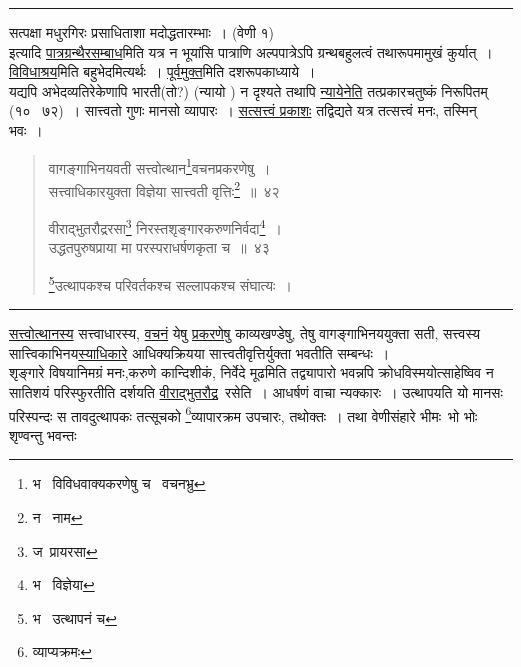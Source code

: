 \documentclass[11pt, openany]{book}
\begin{document}
\hrule

\vspace{2mm}
{\qt सत्पक्षा मधुरगिरः प्रसाधिताशा मदोद्धतारम्भाः~।} (वेणी १)\\

इत्यादि \underline{पात्रग्रन्थैरसम्बाध}मिति यत्र न भूयांसि पात्राणि अल्पपात्रेऽपि ग्रन्थबहुलत्वं तथारूपमामुखं कुर्यात्~। \underline{विविधाश्रय}मिति बहुभेदमित्यर्थः~। \underline{पूर्वमुक्त}मिति दशरूपकाध्याये~।\\

यद्यपि अभेदव्यतिरेकेणापि भारती(तो?) (न्यायो ) न दृश्यते तथापि \underline{न्यायेनेति} तत्प्रकारचतुष्कं निरूपितम् (१० \textendash\ ७२)~। सात्त्वतो गुणः मानसो व्यापारः~। \underline{सत्सत्त्वं प्रकाशः} तद्विद्यते यत्र तत्सत्त्वं मनः, तस्मिन् भवः~।

\newpage

\begin{quote}
{\na वागङ्गाभिनयवती सत्त्वोत्थान\renewcommand{\thefootnote}{1}\footnote{भ \textendash\ विविधवाक्यकरणेषु च \textendash\ वचनभ्रु}वचनप्रकरणेषु~।\\
सत्त्वाधिकारयुक्ता विज्ञेया सात्त्वती वृत्तिः\renewcommand{\thefootnote}{2}\footnote{न \textendash\ नाम}~॥~४२

वीराद्भुतरौद्ररसा\renewcommand{\thefootnote}{3}\footnote{ज\textendash\ प्रायरसा} निरस्तशृङ्गारकरुणनिर्वदा\renewcommand{\thefootnote}{4}\footnote{भ \textendash\ विज्ञेया}~।\\
उद्धतपुरुषप्राया मा परस्पराधर्षणकृता च~॥~४३

\renewcommand{\thefootnote}{5}\footnote{भ \textendash\ उत्थापनं च}उत्थापकश्च परिवर्तकश्च सल्लापकश्च संघात्यः~।}
\end{quote}

\hrule

\vspace{2mm}
\noindent
\underline{सत्त्वोत्थानस्य} सत्त्वाधारस्य, \underline{वचनं} येषु \underline{प्रकरणेषु} काव्यखण्डेषु, तेषु वागङ्गाभिनययुक्ता सती, सत्त्वस्य सात्त्विकाभिनय\underline{स्याधिकारे} आधिक्यक्रियया सात्त्वतीवृत्तिर्युक्ता भवतीति सम्बन्धः~।\\

शृङ्गारे विषयानिमग्रं मनः,करुणे कान्दिशीकं, निर्वेदे मूढमिति तद्व्यापारो भवन्नपि क्रोधविस्मयोत्साहेष्विव न सातिशयं परिस्फुरतीति दर्शयति \underline{वीराद्भुतरौद्र}\textendash\ रसेति~। आधर्षणं वाचा न्यक्कारः~। उत्थापयति यो मानसः परिस्पन्दः स तावदुत्थापकः तत्सूचको \renewcommand{\thefootnote}{1}\footnote{व्याप्यक्रमः}व्यापारक्रम उपचारः, तथोक्तः~। तथा वेणीसंहारे भीमः\textendash\ भो भोः शृण्वन्तु भवन्तः\textendash
\end{document}
